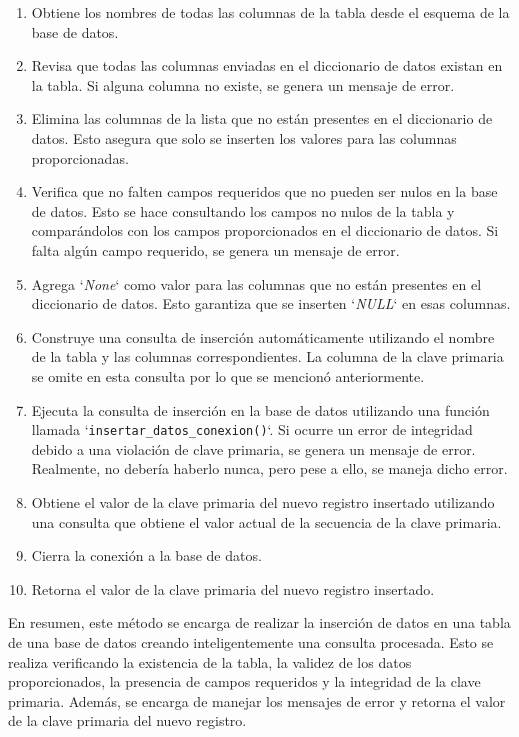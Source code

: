 \documentclass[12pt]{report}
\begin{document}
\begin{itemize}
\begin{enumerate}
    \item Obtiene los nombres de todas las columnas de la tabla desde el esquema de la base de datos.
    
    \item Revisa que todas las columnas enviadas en el diccionario de datos existan en la tabla. Si alguna columna no existe, se genera un mensaje de error.
    
    \item Elimina las columnas de la lista que no están presentes en el diccionario de datos. Esto asegura que solo se inserten los valores para las columnas proporcionadas.
    
    \item Verifica que no falten campos requeridos que no pueden ser nulos en la base de datos. Esto se hace consultando los campos no nulos de la tabla y comparándolos con los campos proporcionados en el diccionario de datos. Si falta algún campo requerido, se genera un mensaje de error.
    
    \item Agrega `\textit{None}` como valor para las columnas que no están presentes en el diccionario de datos. Esto garantiza que se inserten `\textit{NULL}` en esas columnas.
    
    \item Construye una consulta de inserción automáticamente utilizando el nombre de la tabla y las columnas correspondientes. La columna de la clave primaria se omite en esta consulta por lo que se mencionó anteriormente.
    
    \item Ejecuta la consulta de inserción en la base de datos utilizando una función llamada `\texttt{insertar\_datos\_conexion()}`. Si ocurre un error de integridad debido a una violación de clave primaria, se genera un mensaje de error. Realmente, no debería haberlo nunca, pero pese a ello, se maneja dicho error.
    
    \item Obtiene el valor de la clave primaria del nuevo registro insertado utilizando una consulta que obtiene el valor actual de la secuencia de la clave primaria.
    
    \item Cierra la conexión a la base de datos.
    
    \item Retorna el valor de la clave primaria del nuevo registro insertado.
\end{enumerate}
En resumen, este método se encarga de realizar la inserción de datos en una tabla de una base de datos creando inteligentemente una consulta procesada. Esto se realiza verificando la existencia de la tabla, la validez de los datos proporcionados, la presencia de campos requeridos y la integridad de la clave primaria. Además, se encarga de manejar los mensajes de error y retorna el valor de la clave primaria del nuevo registro.


\end{itemize}
\end{document}
